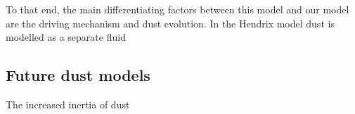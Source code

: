 
To that end, the main differentiating factors between this model and our model are the driving mechanism and dust evolution.
In the Hendrix model dust is modelled as a separate fluid


\subsection{Future dust models}


The increased inertia of dust
